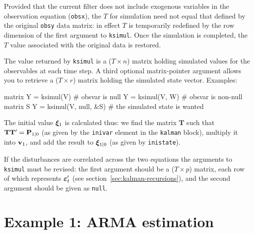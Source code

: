 Provided that the current filter does not include exogenous variables
in the observation equation (\texttt{obsx}), the $T$ for simulation
need not equal that defined by the original \texttt{obsy} data matrix:
in effect $T$ is temporarily redefined by the row dimension of the
first argument to \texttt{ksimul}.  Once the simulation is completed,
the $T$ value associated with the original data is restored.

The value returned by \texttt{ksimul} is a ($T \times n$) matrix
holding simulated values for the observables at each time step.  A
third optional matrix-pointer argument allows you to retrieve a ($T
\times r$) matrix holding the simulated state vector.  Examples:
%
\begin{code}
matrix Y = ksimul(V)    # obsvar is null
Y = ksimul(V, W)        # obsvar is non-null
matrix S
Y = ksimul(V, null, &S) # the simulated state is wanted
\end{code}

The initial value $\bm{\xi}_1$ is calculated thus: we find the matrix
$\mathbf{T}$ such that $\mathbf{T}\mathbf{T}' = \mathbf{P}_{1|0}$ (as
given by the \texttt{inivar} element in the \texttt{kalman} block),
multiply it into $\mathbf{v}_1$, and add the result to $\bm{\xi}_{1|0}$
(as given by \texttt{inistate}).

If the disturbances are correlated across the two equations the
arguments to \texttt{ksimul} must be revised: the first argument
should be a ($T \times p$) matrix, each row of which represents
$\bm{\varepsilon}_t'$ (see section~\ref{sec:kalman-recursions}), and the
second argument should be given as \texttt{null}.



\section{Example 1: ARMA estimation}
\label{sec:example_arma}

